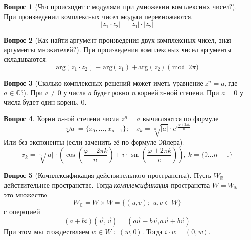 \documentclass[a4paper,11pt]{article}
\theoremstyle{remark}
\theoremstyle{definition}
\newtheorem{question}{Вопрос}
\begin{document}
\begin{question}[Что происходит с модулями при умножении комплексных чисел?]
При произведении комплексных чисел модули перемножаются.
\begin{equation*}
	|z_1 \cdot z_2|= |z_1| \cdot |z_2|
\end{equation*}
\end{question}


\begin{question}[Как найти аргумент произведения двух комплексных чисел, зная аргументы множителей?]
При произведении комплексных чисел аргументы складываются.
\begin{equation*}
	\mathrm{arg}(z_1 \cdot z_2) \equiv \mathrm{arg}(z_1) + \mathrm{arg}(z_2) \pmod{2\pi}
\end{equation*}
\end{question}


\begin{question}[Сколько комплексных решений может иметь уравнение \(z^n = a\), где \(a \in \mathbb{C}\)?]
При \(a \neq 0\) у числа \(a\) будет ровно \(n\) корней \(n\)-ной степени. При \(a = 0\) у числа будет один корень, \(0\).
\end{question}


\begin{question}
Корни \(n\)-ной степени числа \(z^n = a\) вычисляются по формуле 
\begin{equation*}
	\sqrt[n]{a} = \{x_0, \dots, x_{n-1}\}; \quad
	x_k = \sqrt[n]{|a|} \cdot e^{i \frac{\varphi + 2\pi{}k}{n}}
\end{equation*}
Или без экспоненты (если заменить её по формуле Эйлера):
\begin{equation*}
		x_k = \sqrt[n]{|a|} \cdot (\cos({\frac{\varphi + 2\pi{}k}{n}}) + i \cdot \sin({\frac{\varphi + 2\pi{}k}{n}})),\ k = \{0 \dots n - 1\}
\end{equation*}
\end{question}


\begin{question}[Комплексификация действительного пространства]
Пусть \(W_{\mathbb{R}}\) --- действительное пространство. Тогда \emph{комплексификация} пространства \(W = W_{\mathbb{R}}\) --- это множество
\begin{equation*}
	W_{\mathbb{C}} = W \times W = \{(u, v);\;u, v \in W\}
\end{equation*}
с операцией
\begin{equation*}
	(a + bi)(\vec{u}, \vec{v}) = (a\vec{u} - b\vec{v}, a\vec{v} + b\vec{u})
\end{equation*}
При этом мы отождествляем \(w \in W\) с \((w, 0)\). Тогда \(i \cdot w = (0, w)\).
\end{question}
\end{document}
